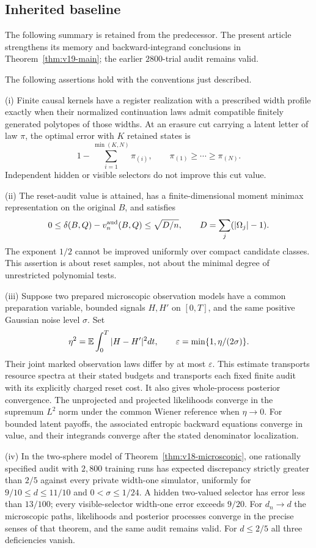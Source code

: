 \subsection{Inherited baseline}
The following summary is retained from the predecessor. The present article
strengthens its memory and backward-integrand conclusions in
Theorem~\ref{thm:v19-main}; the earlier $2800$-trial audit remains valid.

\begin{theorem}
\label{thm:v18-spine}
The following assertions hold with the conventions just described.

\smallskip\noindent
\textup{(i)} Finite causal kernels have a register realization with a
prescribed width profile exactly when their normalized continuation laws
admit compatible finitely generated polytopes of those widths. At an
erasure cut carrying a latent letter of law $\pi$, the optimal error with
$K$ retained states is
\[
 1-\sum_{i=1}^{\min(K,N)}\pi_{(i)},
 \qquad \pi_{(1)}\ge\cdots\ge\pi_{(N)}.
\]
Independent hidden or visible selectors do not improve this cut value.

\smallskip\noindent
\textup{(ii)} The reset-audit value is attained, has a finite-dimensional
moment minimax representation on the original $B$, and satisfies
\[
 0\le\delta(B,Q)-v^{\rm aud}_n(B,Q)\le\sqrt{D/n},
 \qquad D=\sum_j(|\Omega_j|-1).
\]
The exponent $1/2$ cannot be improved uniformly over compact candidate
classes. This assertion is about reset samples, not about the minimal
degree of unrestricted polynomial tests.

\smallskip\noindent
\textup{(iii)} Suppose two prepared microscopic observation models have a
common preparation variable, bounded signals $H,H'$ on $[0,T]$, and the
same positive Gaussian noise level $\sigma$. Set
\[
 \eta^2=\mathbb E\int_0^T|H-H'|^2dt,\qquad
 \varepsilon=\min\{1,\eta/(2\sigma)\}.
\]
Their joint marked observation laws differ by at most $\varepsilon$.
This estimate transports resource spectra at their stated budgets and
transports each fixed finite audit with its explicitly charged reset cost.
It also gives whole-process posterior convergence. The unprojected and
projected likelihoods converge in the supremum $L^2$ norm under the common
Wiener reference when $\eta\to0$. For bounded latent payoffs, the associated
entropic backward equations converge in value, and their integrands
converge after the stated denominator localization.

\smallskip\noindent
\textup{(iv)} In the two-sphere model of
Theorem~\ref{thm:v18-microscopic}, one rationally specified audit with
$2{,}800$ training runs has expected discrepancy strictly greater than
$2/5$ against every private width-one simulator, uniformly for
$9/10\le d\le11/10$ and $0<\sigma\le1/24$. A hidden two-valued selector
has error less than $13/100$; every visible-selector width-one error exceeds
$9/20$. For $d_n\to d$ the microscopic paths, likelihoods and posterior
processes converge in the precise senses of that theorem, and the same
audit remains valid. For $d\le2/5$ all three deficiencies vanish.
\end{theorem}
